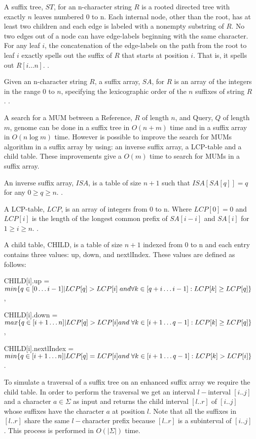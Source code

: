 \documentclass{acm_proc_article-sp}
\begin{document}
\begin{definition}
A suffix tree, $ST$, for an n-character string $R$ is a rooted directed tree with exactly $n$ leaves numbered 0 to n. Each internal node, other than the root, has at least two children and each edge is labeled with a nonempty substring of $R$. No two edges out of a node can have edge-labels beginning with the same character. For any leaf $i$, the concatenation of the edge-labels on the path from the root to leaf $i$ exactly spells out the suffix of $R$ that starts at position $i$. That is, it spells out $R[i\ldots n]$. \cite{Gusfield1997}.
\end{definition}
\begin{definition}
Given an n-character string $R$, a suffix array, $SA$, for $R$ is an array of the integers in the range 0 to $n$, specifying the lexicographic order of the $n$ suffixes of string $R$. \cite{Gusfield1997}.
\end{definition}
A search for a MUM between a Reference, $R$ of length $n$, and Query, $Q$ of length $m$, genome can be done in a suffix tree in $O(n+m)$ time and in a suffix array in $O(n\log m)$ time. However is possible to improve the search for MUMs algorithm in a suffix array by using: an inverse suffix array, a LCP-table and a child table. These improvements give a $O(m)$ time \cite{Abouelhoda2004} to search for MUMs in a suffix array.
\begin{definition}
An inverse suffix array, $ISA$, is a table of size $n+1$ such that $ISA[SA[q]]=q$ for any $0\geq q\geq n$. \cite{Abouelhoda2004}.
\end{definition}
\begin{definition}
A LCP-table, $LCP$, is an array of integers from 0 to n. Where $LCP[0]=0$ and $LCP[i]$ is the length of the longest common prefix of $SA[i-i]$ and $SA[i]$ for $1\geq i \geq n$. \cite{Abouelhoda2004}.
\end{definition}
\begin{definition}
A child table, CHILD, is a table of size $n+1$ indexed from 0 to n and each entry contains three values: up, down, and nextlIndex. These values are defined as follows: 

CHILD[i].up = $min\{q\in [0\ldots i-1]|LCP[q]>LCP[i]\;and\;\\
\forall k\in[q+i\ldots i-1]:LCP[k]\geq LCP[q]\}$,

CHILD[i].down = $max\{q\in[i+1\ldots n]|LCP[q]>LCP[i]\\
and\;\forall k\in[i+1\ldots q-1]:LCP[k]\geq LCP[q]\}$,

CHILD[i].nextlIndex = $min\{q\in[i+1\ldots n]|LCP[q]=LCP[i]\\
and\;\forall k\in[i+1\ldots q-1]:LCP[k]>LCP[i]\}$.
\end{definition}
To simulate a traversal of a suffix tree on an enhanced suffix array we require the child table. In order to perform the traversal we get an interval $l-$interval $[i..j]$ and a character $a\in \Sigma$ as input and returns the child interval $[l..r]$ of $[i..j]$ whose suffixes have the character $a$ at position $l$. Note that all the suffixes in $[l..r]$ share the same $l-$character prefix because $[l..r]$ is a subinterval of $[i..j]$. This process is performed in $O(|\Sigma|)$ time.
\end{document}
